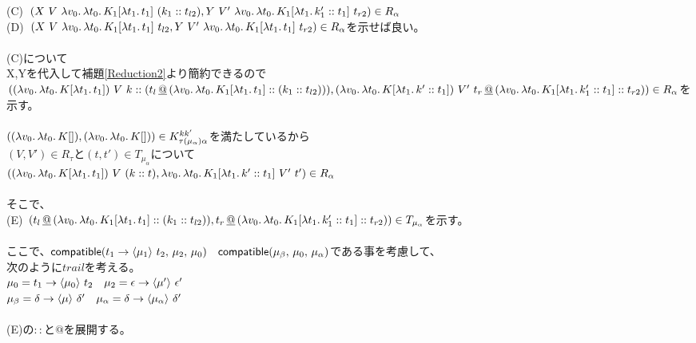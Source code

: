 (C)\ $(X\ V\ \Lam{v_0}{\Lam{t_0}{K_1[\Lam{t_1}{t_1}]}}\ \ConsP{k_1}{t_{l2}},Y\ V'\ \Lam{v_0}{\Lam{t_0}{K_1[\Lam{t_1}{\Cons{k_1'}{t_1}}]}}\ t_{r2})\in R_{\alpha}$\\
(D)\ $(X\ V\ \Lam{v_0}{\Lam{t_0}{K_1[\Lam{t_1}{t_1}]}}\ t_{l2},Y\ V'\ \Lam{v_0}{\Lam{t_0}{K_1[\Lam{t_1}{t_1}]}}\ t_{r2})\in R_{\alpha}$を示せば良い。\\
\\
(C)について\\
X,Yを代入して補題\ref{Reduction2}より簡約できるので\\
$(\LamP{v_0}{\Lam{t_0}{K[\Lam{t_1}{t_1}]}}\ V\ \Cons{k}{(\DAppend{t_l}{\ConsP{\Lam{v_0}{\Lam{t_0}{K_1[\Lam{t_1}{t_1}]}}}{\ConsP{k_1}{t_{l2}}}}}),\\
\LamP{v_0}{\Lam{t_0}{K[\Lam{t_1}{\Cons{k'}{t_1}}]}}\ V'\ \DAppend{t_r}{\ConsP{\Lam{v_0}{\Lam{t_0}{K_1[\Lam{t_1}{\Cons{k_1'}{t_1}}]}}}{t_{r2}}})\in R_{\alpha}$を示す。\\
\\
$(\LamP{v_0}{\Lam{t_0}{K[]}},\LamP{v_0}{\Lam{t_0}{K[]}})\in K^{kk'}_{\tau(\mu_{\alpha})\alpha}$を満たしているから\\
$(V,V')\in R_{\tau}$と$(t, t')\in T_{\mu_{\alpha}}$について\\
$(\LamP{v_0}{\Lam{t_0}{K[\Lam{t_1}{t_1}]}}\ V\ \ConsP{k}{t},
\Lam{v_0}{\Lam{t_0}{K_1[\Lam{t_1}{\Cons{k'}{t_1}}]}}\ V'\ t')\in R_{\alpha}$\\
\\
そこで、\\
(E)\ $(\DAppend{t_l}{\ConsP{\Lam{v_0}{\Lam{t_0}{K_1[\Lam{t_1}{t_1}]}}}{\ConsP{k_1}{t_{l2}}}},
\DAppend{t_r}{\ConsP{\Lam{v_0}{\Lam{t_0}{K_1[\Lam{t_1}{\Cons{k_1'}{t_1}}]}}}{t_{r2}}})\in T_{\mu_{\alpha}}$を示す。\\
\\
ここで、$\Compatible{\Trail{t_1}{t_2}{\mu_1}}{\mu_2}{\mu_0}\quad \Compatible{\mu_\beta}{\mu_0}{\mu_\alpha}$である事を考慮して、\\
次のように$trail$を考える。\\
$\mu_0 = \Trail{t_1}{t_2}{\mu_0}\quad \mu_2 = \Trail{\epsilon}{\epsilon'}{\mu'}$\\
$\mu_{\beta} = \Trail{\delta}{\delta'}{\mu}\quad \mu_{\alpha} = \Trail{\delta}{\delta'}{\mu_{\alpha}}$\\
\\
(E)の$::$と$@$を展開する。

